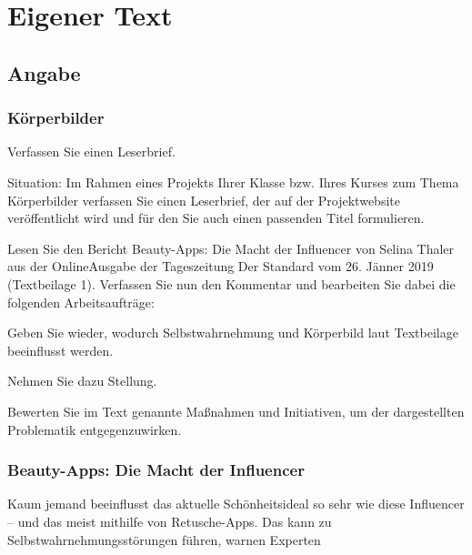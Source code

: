 \section{Eigener Text}
\subsection{Angabe}
\subsubsection{Körperbilder }

Verfassen Sie einen Leserbrief. 

Situation: Im Rahmen eines Projekts Ihrer Klasse bzw. Ihres Kurses zum Thema Körperbilder verfassen Sie einen Leserbrief, der auf der Projektwebsite veröffentlicht wird und für den Sie auch einen passenden Titel formulieren. 

Lesen Sie den Bericht Beauty-Apps: Die Macht der Influencer von Selina Thaler aus der OnlineAusgabe der Tageszeitung Der Standard vom 26. Jänner 2019 (Textbeilage 1). Verfassen Sie nun den Kommentar und bearbeiten Sie dabei die folgenden Arbeitsaufträge: 

\begin{compactitem}
    \item Geben Sie wieder, wodurch Selbstwahrnehmung und Körperbild laut Textbeilage beeinflusst werden.  
    \item Nehmen Sie dazu Stellung. 
    \item Bewerten Sie im Text genannte Maßnahmen und Initiativen, um der dargestellten Problematik entgegenzuwirken. 
\end{compactitem}

\subsubsection{Beauty-Apps: Die Macht der Influencer}

Kaum jemand beeinflusst das aktuelle Schönheitsideal so sehr wie diese Influencer – und das meist mithilfe
von Retusche-Apps. Das kann zu Selbstwahrnehmungsstörungen führen, warnen Experten


